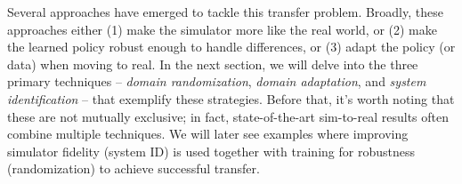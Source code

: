 Several approaches have emerged to tackle this transfer problem. Broadly, these approaches either (1) make the simulator more like the real world, or (2) make the learned policy robust enough to handle differences, or (3) adapt the policy (or data) when moving to real. In the next section, we will delve into the three primary techniques – \textit{domain randomization}, \textit{domain adaptation}, and \textit{system identification} – that exemplify these strategies. Before that, it’s worth noting that these are not mutually exclusive; in fact, state-of-the-art sim-to-real results often combine multiple techniques. We will later see examples where improving simulator fidelity (system ID) is used together with training for robustness (randomization) to achieve successful transfer.